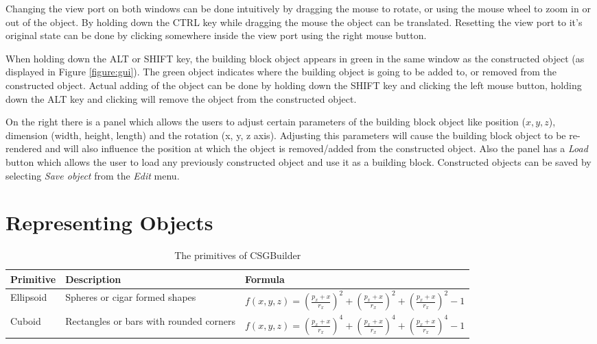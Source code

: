 \documentclass[a4wide,10pt,twocolumn]{article}
\begin{document}
Changing the view port on both windows can be done intuitively by dragging the mouse to rotate, or using the mouse wheel to zoom in or out of the object. By holding down the CTRL key while dragging the mouse the object can be translated. Resetting the view port to it's original state can be done by clicking somewhere inside the view port using the right mouse button.

When holding down the ALT or SHIFT key, the building block object appears in green in the same window as the constructed object (as displayed in Figure \ref{figure:gui}). The green object indicates where the building object is going to be added to, or removed from the constructed object. Actual adding of the object can be done by holding down the SHIFT key and clicking the left mouse button, holding down the ALT key and clicking will remove the object from the constructed object.

On the right there is a panel which allows the users to adjust certain parameters of the building block object like position ($x, y, z$), dimension (width, height, length) and the rotation (x, y, z axis). Adjusting this parameters will cause the building block object to be re-rendered and will also influence the position at which the object is removed/added from the constructed object. Also the panel has a \textit{Load} button which allows the user to load any previously constructed object and use it as a building block. Constructed objects can be saved by selecting \textit{Save object} from the \textit{Edit} menu.

\section{Representing Objects}
\label{chapt:repobj}


    \begin{table}[t!]
        \begin{tabular}{|p{.1\linewidth}|p{.31\linewidth}|p{.50\linewidth}|}
            \hline
            \textbf{Primitive} & \textbf{Description} & \textbf{Formula}\\
            \hline
            \hline
             \vspace{0.1em}
             Ellipsoid &
             \vspace{0.1em}
             Spheres or cigar formed shapes &
             \vspace{0.1em}
             $f(x,y,z)=(\frac{p_x + x}{r_x})^2+(\frac{p_x + x}{r_x})^2+(\frac{p_x + x}{r_x})^2 - 1$\\[1.2em]
            \hline
             \vspace{0.1em}
             Cuboid &
             \vspace{0.1em}
             Rectangles or bars with rounded corners &
             \vspace{0.1em}
             $f(x,y,z)=(\frac{p_x + x}{r_x})^4+(\frac{p_x + x}{r_x})^4+(\frac{p_x + x}{r_x})^4 - 1$\\[1.2em]
            \hline
        \end{tabular}
        \caption{The primitives of CSGBuilder}
        \label{table:primitives}
    \end{table}
\end{document}
